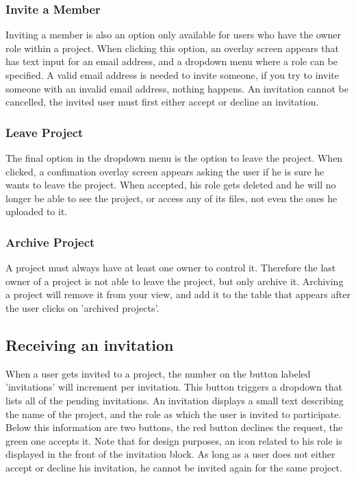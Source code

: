 \subsubsection{Invite a Member}

Inviting a member is also an option only available for users who have the owner role within a project. When clicking this option, an overlay
screen appears that has text input for an email address, and a dropdown menu where a role can be specified. A valid email address is needed
to invite someone, if you try to invite someone with an invalid email address, nothing happens. An invitation cannot be cancelled, the 
invited user must first either accept or decline an invitation.

\subsubsection{Leave Project}

The final option in the dropdown menu is the option to leave the project. When clicked, a confimation overlay screen appears asking the user
if he is sure he wants to leave the project. When accepted, his role gets deleted and he will no longer be able to see the project, or
access any of its files, not even the ones he uploaded to it. 

\subsubsection{Archive Project}

A project must always have at least one owner to control it. Therefore the last owner of a project is not able to leave the project, but only
archive it. Archiving a project will remove it from your view, and add it to the table that appears after the user clicks on 'archived projects'.

\subsection{Receiving an invitation}

When a user gets invited to a project, the number on the button labeled 'invitations' will increment per invitation. This button triggers a dropdown
that lists all of the pending invitations. An invitation displays a small text describing the name of the project, and the role as which
the user is invited to participate. Below this information are two buttons, the red button declines the request, the green one accepts it.
Note that for design purposes, an icon related to his role is displayed in the front of the invitation block. 
As long as a user does not either accept or decline his invitation, he cannot be invited again for the same project.

